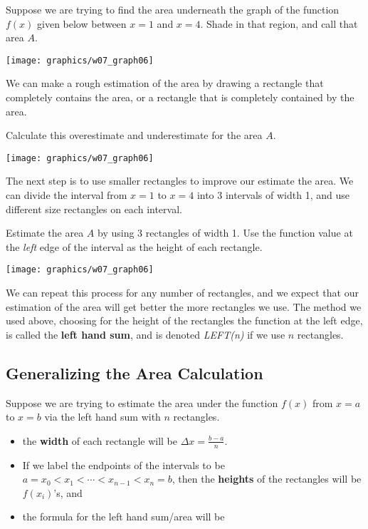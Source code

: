 \newpage

\problem Suppose we are trying to find the area underneath the graph of the
function $f(x)$ given below between $x = 1$ and $x=4$.  Shade in that
region, and call that area $A$.

\begin{center}
\texttt{[image: graphics/w07\_graph06]}
\end{center}


\newpage
We can make a rough estimation of the area by drawing a rectangle that
completely contains the area, or a rectangle that is completely
contained by the area.


\problem 
{Calculate this overestimate and underestimate for the
  area $A$.}
  
\hfill \texttt{[image: graphics/w07\_graph06]}


\newpage The next step is to use smaller rectangles to improve our
estimate the area.  We can divide the interval from $x = 1$ to $x = 4$
into 3 intervals of width 1, and use different size rectangles on each
interval.



\problem Estimate the area $A$ by using 3 rectangles of width 1.
  Use the function value at the {\em left} edge of the interval as the
  height of each rectangle.

\hfill \texttt{[image: graphics/w07\_graph06]}

\newpage

We can repeat this process for any number of rectangles, and we expect
that our estimation of the area will get better the more rectangles we
use.  The method we used above, choosing for the height of the
rectangles the function at the left edge, is called the {\bf left hand
  sum}, and is denoted {\em LEFT(n)} if we use $n$ rectangles.

\newpage

\subsection*{Generalizing the Area Calculation}

Suppose we are trying to estimate the area under the function $f(x)$
from $x = a$ to $x = b$ via the left hand sum with $n$ rectangles.
\begin{itemize}
\item the {\bf width} of each rectangle will be $\Delta x =
\displaystyle\frac{b-a}{n}$.  
\item If we label the endpoints of the
intervals to be $a = x_{0} < x_{1} < \cdots < x_{n-1} < x_{n} = b$,
then the {\bf heights} of the rectangles will be $f(x_{i})$'s, and
\item the formula for the left hand sum/area will be
\end{itemize}

